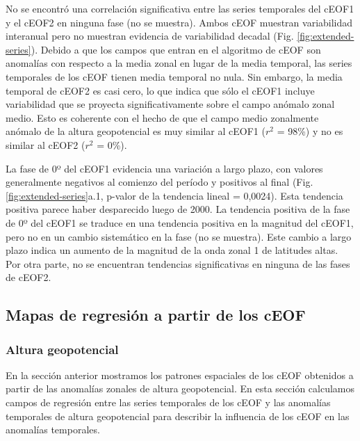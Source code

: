 \documentclass[12pt,oneside,a4paper]{reedthesis}
\begin{document}
No se encontró una correlación significativa entre las series temporales del cEOF1 y el cEOF2 en ninguna fase (no se muestra).
Ambos cEOF muestran variabilidad interanual pero no muestran evidencia de variabilidad decadal (Fig. \ref{fig:extended-series}).
Debido a que los campos que entran en el algoritmo de cEOF son anomalías con respecto a la media zonal en lugar de la media temporal, las series temporales de los cEOF tienen media temporal no nula.
Sin embargo, la media temporal de cEOF2 es casi cero, lo que indica que sólo el cEOF1 incluye variabilidad que se proyecta significativamente sobre el campo anómalo zonal medio.
Esto es coherente con el hecho de que el campo medio zonalmente anómalo de la altura geopotencial es muy similar al cEOF1 (\(r^2\) = 98\%) y no es similar al cEOF2 (\(r^2\) = 0\%).

La fase de 0º del cEOF1 evidencia una variación a largo plazo, con valores generalmente negativos al comienzo del período y positivos al final (Fig. \ref{fig:extended-series}a.1, p-valor de la tendencia lineal = 0,0024).
Esta tendencia positiva parece haber desparecido luego de 2000.
La tendencia positiva de la fase de 0º del cEOF1 se traduce en una tendencia positiva en la magnitud del cEOF1, pero no en un cambio sistemático en la fase (no se muestra).
Este cambio a largo plazo indica un aumento de la magnitud de la onda zonal 1 de latitudes altas.
Por otra parte, no se encuentran tendencias significativas en ninguna de las fases de cEOF2.

\hypertarget{mapas-de-regresiuxf3n-a-partir-de-los-ceof}{%
\subsection{Mapas de regresión a partir de los cEOF}\label{mapas-de-regresiuxf3n-a-partir-de-los-ceof}}

\hypertarget{altura-geopotencial}{%
\subsubsection{Altura geopotencial}\label{altura-geopotencial}}

En la sección anterior mostramos los patrones espaciales de los cEOF obtenidos a partir de las anomalías zonales de altura geopotencial.
En esta sección calculamos campos de regresión entre las series temporales de los cEOF y las anomalías temporales de altura geopotencial para describir la influencia de los cEOF en las anomalías temporales.
\end{document}
